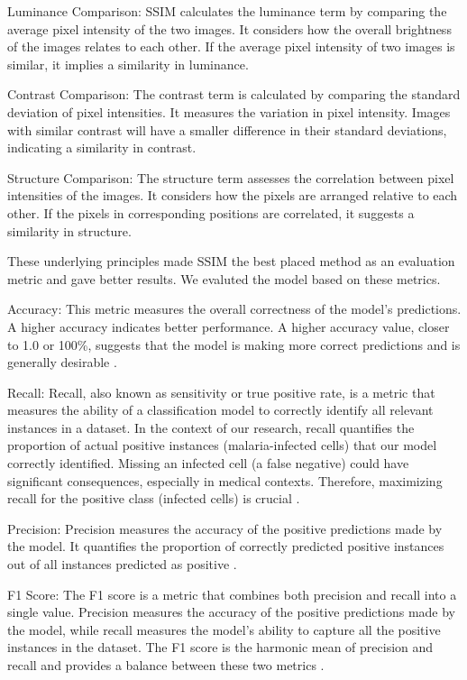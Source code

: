\documentclass[journal,12pt,onecolumn,draftcls]{IEEEtran}
\begin{document}
Luminance Comparison: SSIM calculates the luminance term by comparing the average pixel intensity of the two images. It considers how the overall brightness of the images relates to each other. If the average pixel intensity of two images is similar, it implies a similarity in luminance.

Contrast Comparison: The contrast term is calculated by comparing the standard deviation of pixel intensities. It measures the variation in pixel intensity. Images with similar contrast will have a smaller difference in their standard deviations, indicating a similarity in contrast.

Structure Comparison: The structure term assesses the correlation between pixel intensities of the images. It considers how the pixels are arranged relative to each other. If the pixels in corresponding positions are correlated, it suggests a similarity in structure.

These underlying principles made SSIM the best placed method as an evaluation metric and gave better results. We evaluted the model based on these metrics.

Accuracy: This metric measures the overall correctness of the model's predictions. A higher accuracy indicates better performance. A higher accuracy value, closer to 1.0 or 100\%, suggests that the model is making more correct predictions and is generally desirable \cite{powers2011}.

Recall: Recall, also known as sensitivity or true positive rate, is a metric that measures the ability of a classification model to correctly identify all relevant instances in a dataset. In the context of our research, recall quantifies the proportion of actual positive instances (malaria-infected cells) that our model correctly identified. Missing an infected cell (a false negative) could have significant consequences, especially in medical contexts. Therefore, maximizing recall for the positive class (infected cells) is crucial \cite{powers2011}.

Precision: Precision measures the accuracy of the positive predictions made by the model. It quantifies the proportion of correctly predicted positive instances out of all instances predicted as positive \cite{powers2011}.

F1 Score: The F1 score is a metric that combines both precision and recall into a single value. Precision measures the accuracy of the positive predictions made by the model, while recall measures the model's ability to capture all the positive instances in the dataset. The F1 score is the harmonic mean of precision and recall and provides a balance between these two metrics \cite{powers2011}.
\end{document}
